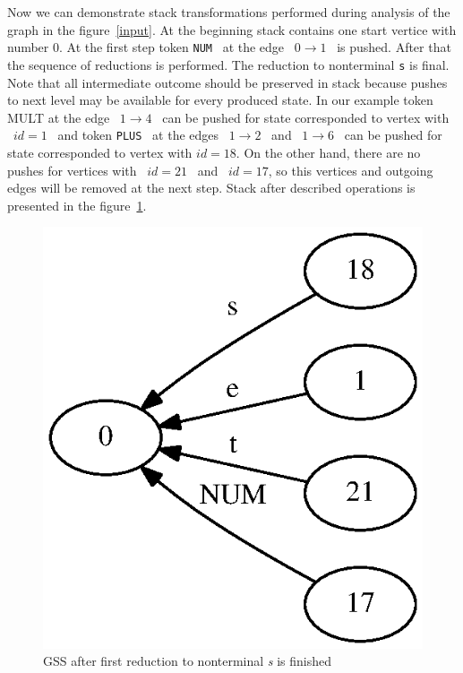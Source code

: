 \documentclass{sigplanconf}
\begin{document}
Now we can demonstrate stack transformations performed during analysis of the graph in the figure~\ref{input}. At the beginning stack contains one start vertice with number 0. At the first step token \verb|NUM| \ at the edge \ $ 0 \to 1$ \ is pushed. After that the sequence of reductions is performed. The reduction to nonterminal \verb|s| is final. Note that all intermediate outcome should be preserved in stack because pushes to next level may be available for every produced state. In our example token MULT at the edge \ $ 1 \to 4 $ \ can be pushed for state corresponded to vertex with \ $id=1$ \ and token \verb|PLUS| \ at the edges \ $1 \to 2$ \ and \ $1 \to 6$ \ can be pushed for state corresponded to vertex with $id=18$. On the other hand, there are no pushes for vertices with \ $id=21$ \ and \ $id=17$, so this vertices and outgoing edges will be removed at the next step. Stack after described operations is presented in the figure~\ref{stack1}.

\begin{figure}[h!]
    \begin{center}
        \includegraphics[scale=0.45]{Graphs/stack_1_2.eps}
    \end{center}
    \caption{GSS after first reduction to nonterminal {\it s} is finished}
    \label{stack1}
\end{figure}
\end{document}
